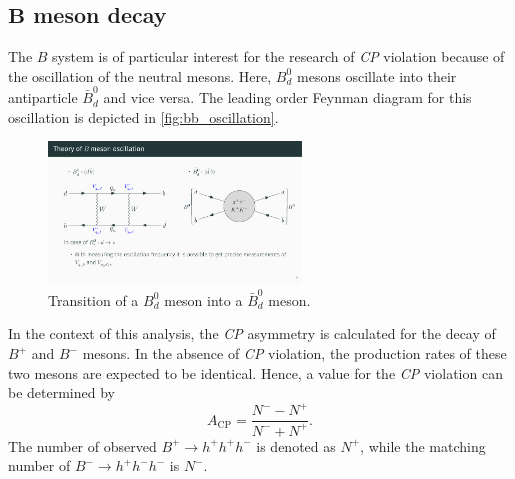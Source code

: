 \subsection{$\symbf{B}$ meson decay}
The $B$ system is of particular interest for the research of \textit{CP} violation because of the oscillation of the neutral mesons. Here, $B_d^0$ mesons 
oscillate into their antiparticle $\bar{B}_d^0$ and vice versa. The leading order Feynman diagram for this oscillation is depicted in \autoref{fig:bb_oscillation}.
\begin{figure}
    \centering
    \includegraphics[width=0.6\textwidth]{content/pics/bb_oscillation.pdf}
    \caption{Transition of a $B_d^0$ meson into a $\bar{B}_d^0$ meson.}
    \label{fig:bb_oscillation}
\end{figure}

In the context of this analysis, the \textit{CP} asymmetry is calculated for the decay of $B^+$ and $B^-$ mesons. In the absence of \textit{CP} violation, 
the production rates of these two mesons are expected to be identical. Hence, a value for the \textit{CP} violation can be determined by
\begin{equation}
    A_{\mathrm{CP}} = \frac{N^--N^+}{N^-+N^+}.
    \label{eq:CP_asymmetry}
\end{equation}
The number of observed $B^+ \rightarrow h^+h^+h^-$ is denoted as $N^+$, while the matching number of $B^- \rightarrow h^+h^-h^-$ is $N^-$.
